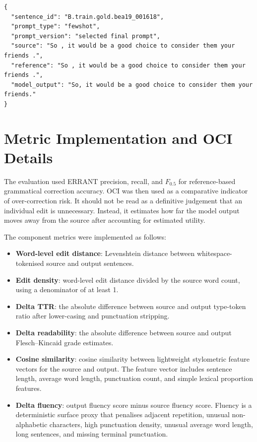 \begin{verbatim}
{
  "sentence_id": "B.train.gold.bea19_001618",
  "prompt_type": "fewshot",
  "prompt_version": "selected final prompt",
  "source": "So , it would be a good choice to consider them your friends .",
  "reference": "So , it would be a good choice to consider them your friends .",
  "model_output": "So, it would be a good choice to consider them your friends."
}
\end{verbatim}

\section{Metric Implementation and OCI Details}
\label{app:metric-implementation}

The evaluation used ERRANT precision, recall, and $F_{0.5}$ for reference-based grammatical correction accuracy. OCI was then used as a comparative indicator of over-correction risk. It should not be read as a definitive judgement that an individual edit is unnecessary. Instead, it estimates how far the model output moves away from the source after accounting for estimated utility.

The component metrics were implemented as follows:
\begin{itemize}
    \item \textbf{Word-level edit distance}: Levenshtein distance between whitespace-tokenised source and output sentences.
    \item \textbf{Edit density}: word-level edit distance divided by the source word count, using a denominator of at least 1.
    \item \textbf{Delta TTR}: the absolute difference between source and output type-token ratio after lower-casing and punctuation stripping.
    \item \textbf{Delta readability}: the absolute difference between source and output Flesch--Kincaid grade estimates.
    \item \textbf{Cosine similarity}: cosine similarity between lightweight stylometric feature vectors for the source and output. The feature vector includes sentence length, average word length, punctuation count, and simple lexical proportion features.
    \item \textbf{Delta fluency}: output fluency score minus source fluency score. Fluency is a deterministic surface proxy that penalises adjacent repetition, unusual non-alphabetic characters, high punctuation density, unusual average word length, long sentences, and missing terminal punctuation.
\end{itemize}

